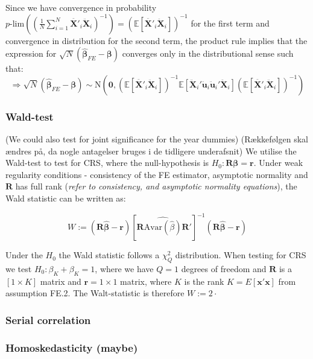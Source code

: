 Since we have convergence in probability $p\text{-lim}\left( \left(\frac{1}{N} \sum_{i=1}^N {\pmb{\ddot{X'}}_{i} \pmb{\ddot{X}}_{i} } \right)^{-1}\right)=(\mathbb{E}[\pmb{\ddot{X'}}_{i} \pmb{\ddot{X}}_{i}])^{-1}$ for the first term and convergence in distribution for the second term, the product rule implies that the expression for $\sqrt{N}(\pmb{\hat{\beta}}_{FE}-\pmb{\beta})$ converges only in the distributional sense such that:
$$\Rightarrow \sqrt{N}(\pmb{\hat{\beta}}_{FE}-\pmb{\beta}) \sim \text{N} \left(\pmb{0},
(\mathbb{E}[\pmb{\ddot{X'}}_{i} \pmb{\ddot{X}}_{i}])^{-1} \mathbb{E}[\pmb{\ddot{X}}_i' \pmb{\ddot{u}}_i\pmb{\ddot{u}}_i'\pmb{\ddot{X}}_i] (\mathbb{E}[\pmb{\ddot{X'}}_{i} \pmb{\ddot{X}}_{i}])^{-1} \right)$$



\subsubsection*{Wald-test}
(We could also test for joint significance for the year dummies) \newline
(Rækkefølgen skal ændres på, da nogle antagelser bruges i de tidligere underafsnit) \newline
We utilise the Wald-test to test for CRS, where the null-hypothesis is $H_0: \mathbf{R}\boldsymbol{\beta}=\mathbf{r}$. Under weak regularity conditions - consistency of the FE estimator, asymptotic normality and $\mathbf{R}$ has full rank (\textit{refer to  consistency, and asymptotic normality equations}), the Wald statistic can be written as:


\begin{equation*}
    W:=(\mathbf{R}\widehat{\boldsymbol{\beta}}-\mathbf{r})[\mathbf{R}\widehat{\text{Avar}(\widehat{\beta})}\mathbf{R}']^{-1}(\mathbf{R} \boldsymbol{\widehat{\beta}}-\mathbf{r})
\end{equation*}

Under the $H_0$ the Wald statistic follows a $\chi^2_Q$ distribution. When testing for CRS we test $H_0:\beta_K+\beta_K=1$, where we have $Q=1$ degrees of freedom and  $\mathbf{R}$ is a $[1 \times K]$ matrix and $\textbf{r}=1 \times 1$ matrix, where $K$ is the rank $K=E[\textbf{x}'\textbf{x}]$  from assumption FE.2.
The Walt-statistic is therefore $W:=2·$
\subsubsection*{Serial correlation}

\subsubsection*{Homoskedasticity (maybe)}

